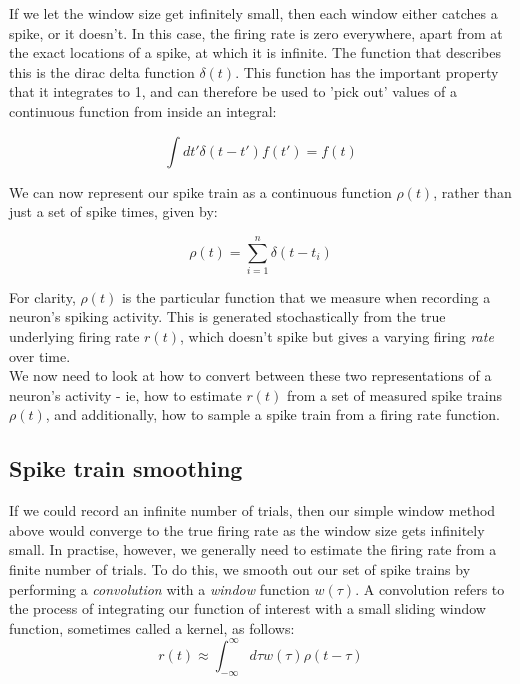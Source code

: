 \documentclass{article}
\begin{document}
If we let the window size get infinitely small, then each window either catches a spike, or it doesn't. In this case, the firing rate is zero everywhere, apart from at the exact locations of a spike, at which it is infinite. The function that describes this is the dirac delta function $\delta (t)$. This function has the important property that it integrates to 1, and can therefore be used to 'pick out' values of a continuous function from inside an integral:

\begin{equation*}
	\int dt' \delta (t-t') f(t') = f(t)
\end{equation*}

We can now represent our spike train as a continuous function $\rho (t)$, rather than just a set of spike times, given by:

\begin{equation*}
	\rho (t) = \sum_{i=1}^n \delta(t-t_i)
\end{equation*}

For clarity, $\rho(t)$ is the particular function that we measure when recording a neuron's spiking activity. This is generated stochastically from the true underlying firing rate $r(t)$, which doesn't spike but gives a varying firing \textit{rate} over time.\\

We now need to look at how to convert between these two representations of a neuron's activity - ie, how to estimate $r(t)$ from a set of measured spike trains $\rho(t)$, and additionally, how to sample a spike train from a firing rate function.

\subsection{Spike train smoothing}

If we could record an infinite number of trials, then our simple window method above would converge to the true firing rate as the window size gets infinitely small. In practise, however, we generally need to estimate the firing rate from a finite number of trials. To do this, we smooth out our set of spike trains by performing a \textit{convolution} with a \textit{window} function $w(\tau)$. A convolution refers to the process of integrating our function of interest with a small sliding window function, sometimes called a kernel, as follows:\\

\begin{equation*}
	r(t) \approx \int_{- \infty}^{\infty} d\tau w(\tau) \rho(t-\tau)
\end{equation*}
\end{document}
